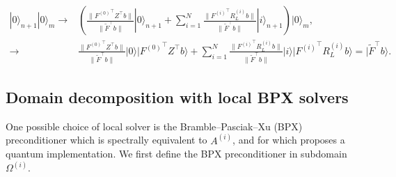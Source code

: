 \documentclass[onefignum,onetabnum]{siamart251216}
\newcommand{\ket}[1]{ | #1 \rangle}
\begin{document}
\[
\begin{aligned}
\ket{0}_{n+1} \ket{0}_m \rightarrow & \left( \frac{\|{F^{(0)}}^\top Z^\top b\|}{\|{\tilde{F}}^\top b\|} \ket{0}_{n+1} + \sum_{i=1}^N \frac{\|{F^{(i)}}^\top R_L^{(i)} b\|}{\|{\tilde{F}}^\top b\|} \ket{i}_{{n+1}} \right) \ket{0}_{m}, \\
\rightarrow & \frac{\|{F^{(0)}}^\top Z^\top b\|}{\|{\tilde{F}}^\top b\|} \ket{0} \ket{{F^{(0)}}^\top Z^\top b } + \sum_{i=1}^N \frac{\|{F^{(i)}}^\top R_L^{(i)} b\|}{\|{\tilde{F}}^\top b\|} \ket{i} \ket{{F^{(i)}}^\top R_L^{(i)} b } = \ket{\tilde{F}^\top b}.
\end{aligned}
\]


\subsection{Domain decomposition with local BPX solvers}
\label{sec:quantumDDBPX}
One possible choice of local solver is the Bramble--Pasciak--Xu (BPX) preconditioner \cite{zbMATH04197323} which is spectrally equivalent to $A^{(i)}$, and for which \cite{Deiml_2025} proposes a quantum implementation. We first define the BPX preconditioner in subdomain $\Omega^{(i)}$.
\end{document}
